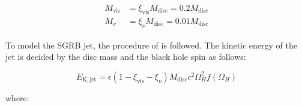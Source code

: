     \begin{align}
        \begin{split}
            M_{\mathrm{vis}} &=
                \xi_{\mathrm{vis}}M_{\mathrm{disc}} =
                    0.2M_{\mathrm{disc}} \\
            M_{\nu} &=
                \xi_{\nu}M_{\mathrm{disc}} =
                    0.01 M_{\mathrm{disc}}
        \end{split}
    \end{align}

    To model the SGRB jet, the procedure of \cite{zhu_2020} is followed. The
    kinetic energy of the jet is decided by the disc mass and the black hole spin as
    follows:

    \begin{equation}
        E_{\mathrm{K, jet}} =
            \epsilon(1 - \xi_{\mathrm{vis}} - \xi_{\nu})
            M_{\mathrm{disc}} c^2 \Omega_H^2 f(\Omega_H)
        \label{eq:e_kin_jet}
    \end{equation}

    where:

